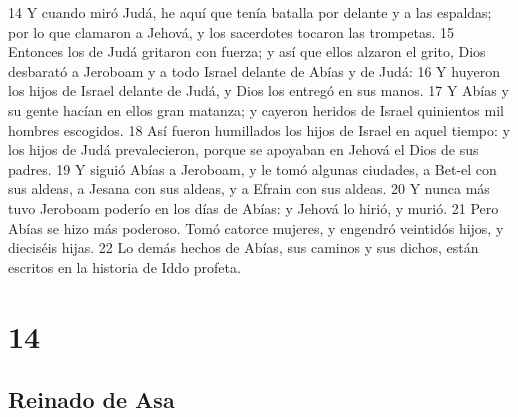 14 Y cuando miró Judá, he aquí que tenía batalla por delante y a las espaldas; por lo que clamaron a Jehová, y los sacerdotes tocaron las trompetas.
15 Entonces los de Judá gritaron con fuerza; y así que ellos alzaron el grito, Dios desbarató a Jeroboam y a todo Israel delante de Abías y de Judá:
16 Y huyeron los hijos de Israel delante de Judá, y Dios los entregó en sus manos.
17 Y Abías y su gente hacían en ellos gran matanza; y cayeron heridos de Israel quinientos mil hombres escogidos.
18 Así fueron humillados los hijos de Israel en aquel tiempo: y los hijos de Judá prevalecieron, porque se apoyaban en Jehová el Dios de sus padres.
19 Y siguió Abías a Jeroboam, y le tomó algunas ciudades, a Bet-el con sus aldeas, a Jesana con sus aldeas, y a Efrain con sus aldeas.
20 Y nunca más tuvo Jeroboam poderío en los días de Abías: y Jehová lo hirió, y murió.
21 Pero Abías se hizo más poderoso. Tomó catorce mujeres, y engendró veintidós hijos, y dieciséis hijas.
22 Lo demás hechos de Abías, sus caminos y sus dichos, están escritos en la historia de Iddo profeta.

\chapter{14}

\section*{Reinado de Asa}

